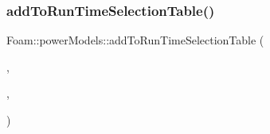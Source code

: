 \subsubsection{\texorpdfstring{add\+To\+Run\+Time\+Selection\+Table()}{addToRunTimeSelectionTable()}\hspace{0.1cm}{\footnotesize\ttfamily [5/5]}}
{\footnotesize\ttfamily Foam\+::power\+Models\+::add\+To\+Run\+Time\+Selection\+Table (\begin{DoxyParamCaption}\item[{\hyperlink{classFoam_1_1powerModel}{power\+Model}}]{,  }\item[{\hyperlink{classFoam_1_1powerModels_1_1nuclearFuelPinTest}{nuclear\+Fuel\+Pin\+Test}}]{,  }\item[{power\+Models}]{ }\end{DoxyParamCaption})}

